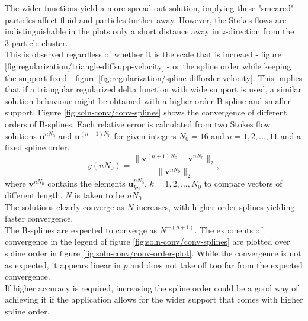 \documentclass[a4paper,
twoside=false,abstract=false,numbers=noenddot,
titlepage=false,headings=small,parskip=half,version=last]{scrartcl}
\begin{document}
The wider functions yield a more spread out solution, implying these "smeared" particles affect fluid and particles further away.
However, the Stokes flows are indistinguishable in the plots only a short distance away in $z$-direction from the 3-particle cluster.\\
This is observed regardless of whether it is the scale that is increaed - figure \ref{fig:regularization/triangle-diffsupp-velocity} - or the spline order while keeping the support fixed - figure \ref{fig:regularization/spline-difforder-velocity}. This implies that if a triangular regularized delta function with wide support is used, a similar solution behaviour might be obtained with a higher order B-spline and smaller support.
Figure \ref{fig:soln-conv/conv-splines} shows the convergence of different orders of B-splines.
Each relative error is calculated from two Stokes flow solutions $\mathbf{u}^{nN_0}$ and $\mathbf{u}^{(n+1)N_0}$ for given integers $N_0=16$ and $n=1,2,...,11$ and a fixed spline order.
\begin{equation}
y(nN_0) = \frac{\|\mathbf{v}^{(n+1)N_0}-\mathbf{v}^{nN_0}\|_2}{\|\mathbf{v}^{nN_0}\|_2},
\end{equation}
where $\mathbf{v}^{nN_0}$ contains the elements $\mathbf{u}^{nN_0}_{kn}$, $k=1,2,...,N_0$ to compare vectors of different length. $N$ is taken to be $nN_0$.\\
The solutions clearly converge as $N$ increases, with higher order splines yielding faster convergence.\\
The B-splines are expected to converge as $N^{-(p+1)}$.
The exponents of convergence in the legend of figure \ref{fig:soln-conv/conv-splines} are plotted over spline order in figure \ref{fig:soln-conv/conv-order-plot}.
While the convergence is not as expected, it appears linear in $p$ and does not take off too far from the expected convergence.\\
If higher accuracy is required, increasing the spline order could be a good way of achieving it if the application allows for the wider support that comes with higher spline order.
\end{document}
